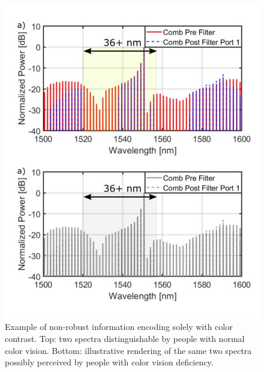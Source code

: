 \begin{figure}[!ht]%
    \includegraphics[width=\linewidth]{../../fig/color.pdf}
    \caption{Example of non-robust information encoding solely with color contrast. Top: two spectra distinguishable by people with normal color vision. Bottom: illustrative rendering of the same two spectra possibly perceived by people with color vision deficiency.}
    \label{fig:color}
\end{figure}

